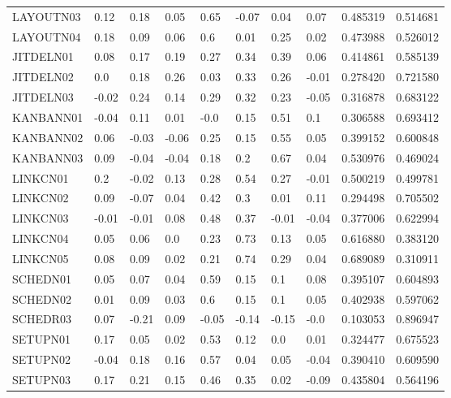 \begin{landscape}
\begin{longtable}{llllllllll}
LAYOUTN03 & 0.12 & 0.18 & 0.05 & \cellcolor{yellow}0.65 & -0.07 & 0.04 & 0.07 & 0.485319 & 0.514681 \\
LAYOUTN04 & 0.18 & 0.09 & 0.06 & \cellcolor{yellow}0.6 & 0.01 & 0.25 & 0.02 & 0.473988 & 0.526012 \\
JITDELN01 & 0.08 & 0.17 & 0.19 & 0.27 & 0.34 & 0.39 & 0.06 & 0.414861 & 0.585139 \\
JITDELN02 & 0.0 & 0.18 & 0.26 & 0.03 & 0.33 & 0.26 & -0.01 & 0.278420 & 0.721580 \\
JITDELN03 & -0.02 & 0.24 & 0.14 & 0.29 & 0.32 & 0.23 & -0.05 & 0.316878 & 0.683122 \\
KANBANN01 & -0.04 & 0.11 & 0.01 & -0.0 & 0.15 & \cellcolor{yellow}0.51 & 0.1 & 0.306588 & 0.693412 \\
KANBANN02 & 0.06 & -0.03 & -0.06 & 0.25 & 0.15 & \cellcolor{yellow}0.55 & 0.05 & 0.399152 & 0.600848 \\
KANBANN03 & 0.09 & -0.04 & -0.04 & 0.18 & 0.2 & \cellcolor{yellow}0.67 & 0.04 & 0.530976 & 0.469024 \\
LINKCN01 & 0.2 & -0.02 & 0.13 & 0.28 & \cellcolor{yellow}0.54 & 0.27 & -0.01 & 0.500219 & 0.499781 \\
LINKCN02 & 0.09 & -0.07 & 0.04 & 0.42 & 0.3 & 0.01 & 0.11 & 0.294498 & 0.705502 \\
LINKCN03 & -0.01 & -0.01 & 0.08 & 0.48 & 0.37 & -0.01 & -0.04 & 0.377006 & 0.622994 \\
LINKCN04 & 0.05 & 0.06 & 0.0 & 0.23 & \cellcolor{yellow}0.73 & 0.13 & 0.05 & 0.616880 & 0.383120 \\
LINKCN05 & 0.08 & 0.09 & 0.02 & 0.21 & \cellcolor{yellow}0.74 & 0.29 & 0.04 & 0.689089 & 0.310911 \\
SCHEDN01 & 0.05 & 0.07 & 0.04 & \cellcolor{yellow}0.59 & 0.15 & 0.1 & 0.08 & 0.395107 & 0.604893 \\
SCHEDN02 & 0.01 & 0.09 & 0.03 & \cellcolor{yellow}0.6 & 0.15 & 0.1 & 0.05 & 0.402938 & 0.597062 \\
SCHEDR03 & 0.07 & -0.21 & 0.09 & -0.05 & -0.14 & -0.15 & -0.0 & 0.103053 & 0.896947 \\
SETUPN01 & 0.17 & 0.05 & 0.02 & \cellcolor{yellow}0.53 & 0.12 & 0.0 & 0.01 & 0.324477 & 0.675523 \\
SETUPN02 & -0.04 & 0.18 & 0.16 & \cellcolor{yellow}0.57 & 0.04 & 0.05 & -0.04 & 0.390410 & 0.609590 \\
SETUPN03 & 0.17 & 0.21 & 0.15 & 0.46 & 0.35 & 0.02 & -0.09 & 0.435804 & 0.564196 \\
\end{longtable}

\end{landscape}